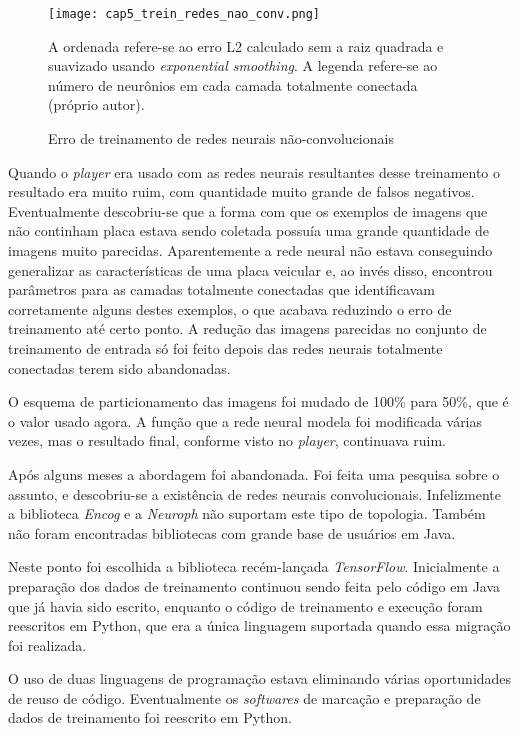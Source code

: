 \begin{figure}[!htb]
	\centering
	\texttt{[image: cap5\_trein\_redes\_nao\_conv.png]}
	\caption{Erro de treinamento de redes neurais não-convolucionais}
	\label{fig:cap5_trein_redes_nao_conv}
	A ordenada refere-se ao erro L2 calculado sem a raiz quadrada e suavizado
	usando \emph{exponential smoothing}. A legenda refere-se ao número de
	neurônios em cada camada totalmente conectada (próprio autor).
\end{figure}

Quando o \emph{player} era usado com as redes neurais resultantes
desse treinamento o
resultado era muito ruim, com quantidade muito grande de falsos negativos.
Eventualmente descobriu-se que a forma com que os exemplos de imagens que não
continham placa estava sendo coletada possuía uma grande quantidade de imagens
muito parecidas. Aparentemente a rede neural não estava conseguindo generalizar
as características de uma placa veicular e, ao invés disso, encontrou
parâmetros para as camadas totalmente conectadas que identificavam corretamente
alguns destes exemplos, o que acabava reduzindo o erro de treinamento até certo
ponto. A redução das imagens parecidas no conjunto de treinamento de entrada só
foi feito depois das redes neurais totalmente conectadas terem sido
abandonadas.

O esquema de particionamento das imagens foi mudado de 100\% para 50\%, que é o
valor usado agora. A função que a rede neural modela foi modificada
várias vezes, mas o resultado final, conforme visto no \emph{player},
continuava ruim.

Após alguns meses a abordagem foi abandonada. Foi feita uma pesquisa sobre o
assunto, e descobriu-se a existência de redes neurais convolucionais.
Infelizmente
a biblioteca \emph{Encog} e a \emph{Neuroph} não suportam este tipo de
topologia. Também não foram encontradas bibliotecas com grande base de
usuários em Java.

Neste ponto foi escolhida a biblioteca recém-lançada \emph{TensorFlow}.
Inicialmente a
preparação dos dados de treinamento continuou sendo feita pelo código em Java
que já havia sido escrito, enquanto o código de treinamento e execução foram
reescritos em Python, que era a única linguagem suportada quando essa
migração foi realizada.

O uso de duas linguagens de programação estava eliminando várias oportunidades
de reuso de código. Eventualmente os \emph{softwares} de marcação e preparação
de dados de treinamento foi reescrito em Python.

